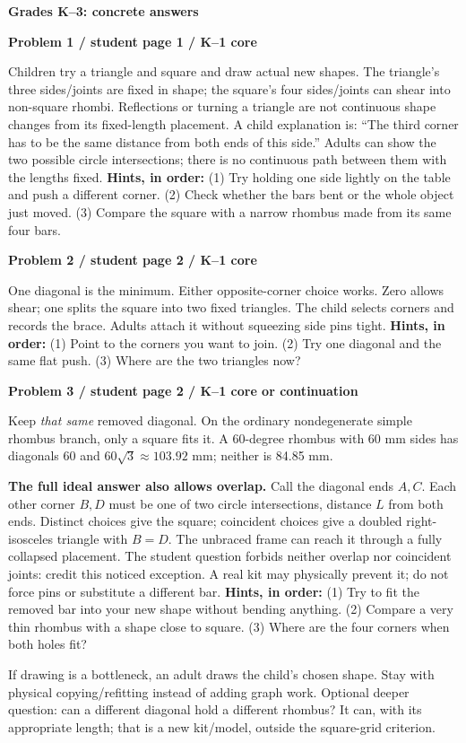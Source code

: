 \documentclass[letterpaper,11pt]{article}
\newcommand{\titleline}[1]{\par{\large\bfseries #1}\par}
\newcommand{\sub}[1]{\par\textbf{#1}\par}
\newcommand{\task}[3]{\sub{Problem #1 / student page #2 / #3}}
\newcommand{\hints}[3]{\textbf{Hints, in order:} (1) #1 (2) #2 (3) #3\par}
\begin{document}
\newpage
\titleline{Grades K--3: concrete answers}
\task{1}{1}{K--1 core}
Children try a triangle and square and draw actual new shapes. The triangle's three sides/joints are fixed in shape; the square's four sides/joints can shear into non-square rhombi. Reflections or turning a triangle are not continuous shape changes from its fixed-length placement. A child explanation is: ``The third corner has to be the same distance from both ends of this side.'' Adults can show the two possible circle intersections; there is no continuous path between them with the lengths fixed.
\hints{Try holding one side lightly on the table and push a different corner.}{Check whether the bars bent or the whole object just moved.}{Compare the square with a narrow rhombus made from its same four bars.}

\task{2}{2}{K--1 core}
One diagonal is the minimum. Either opposite-corner choice works. Zero allows shear; one splits the square into two fixed triangles. The child selects corners and records the brace. Adults attach it without squeezing side pins tight.
\hints{Point to the corners you want to join.}{Try one diagonal and the same flat push.}{Where are the two triangles now?}

\task{3}{2}{K--1 core or continuation}
Keep \emph{that same} removed diagonal. On the ordinary nondegenerate simple rhombus branch, only a square fits it. A 60-degree rhombus with 60 mm sides has diagonals 60 and $60\sqrt3\approx103.92$ mm; neither is 84.85 mm.

\textbf{The full ideal answer also allows overlap.} Call the diagonal ends $A,C$. Each other corner $B,D$ must be one of two circle intersections, distance $L$ from both ends. Distinct choices give the square; coincident choices give a doubled right-isosceles triangle with $B=D$. The unbraced frame can reach it through a fully collapsed placement. The student question forbids neither overlap nor coincident joints: credit this noticed exception. A real kit may physically prevent it; do not force pins or substitute a different bar.
\hints{Try to fit the removed bar into your new shape without bending anything.}{Compare a very thin rhombus with a shape close to square.}{Where are the four corners when both holes fit?}
If drawing is a bottleneck, an adult draws the child's chosen shape. Stay with physical copying/refitting instead of adding graph work. Optional deeper question: can a different diagonal hold a different rhombus? It can, with its appropriate length; that is a new kit/model, outside the square-grid criterion.
\end{document}
